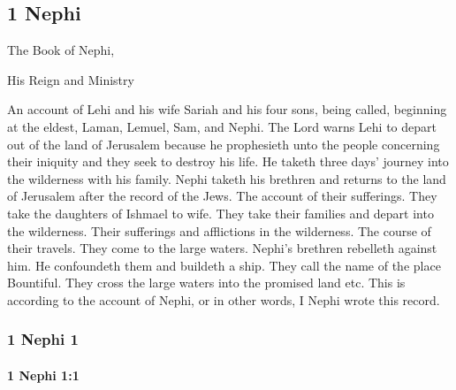 \subsection{1 Nephi}
	\label{1NEPHI}
	
	The Book of Nephi,
	
	His Reign and Ministry
	
	An account of Lehi and his wife Sariah and his four sons,
	being called, beginning at the eldest,
	Laman, Lemuel, Sam, and Nephi.
	The Lord warns Lehi to depart out of the land of Jerusalem
	because he prophesieth unto the people concerning their iniquity
	and they seek to destroy his life.
	He taketh three days' journey into the wilderness with his family.
	Nephi taketh his brethren and returns to the land of Jerusalem
	after the record of the Jews.
	The account of their sufferings.
	They take the daughters of Ishmael to wife.
	They take their families and depart into the wilderness.
	Their sufferings and afflictions in the wilderness.
	The course of their travels.
	They come to the large waters.
	Nephi's brethren rebelleth against him.
	He confoundeth them and buildeth a ship.
	They call the name of the place Bountiful.
	They cross the large waters into the promised land etc.
	This is according to the account of Nephi,
	or in other words, I Nephi wrote this record.

	\subsubsection{1 Nephi 1} %
		\label{1NEPHI-1}
	
		\paragraph{1 Nephi 1:1} %
			\label{1NEPHI-1-1}


